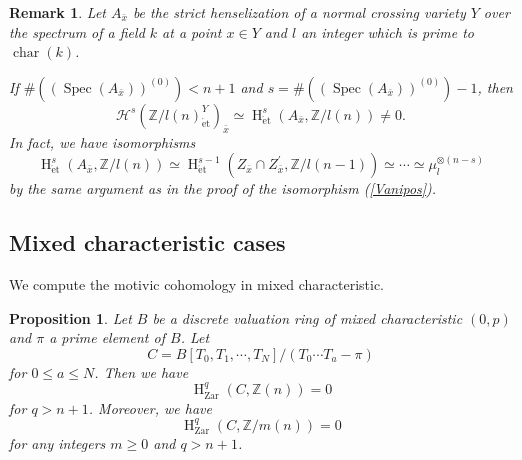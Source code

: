 \documentclass{article}
\newtheorem{prop}[thm]{\indent \sc Proposition}
\newtheorem{rem}[thm]{\indent \sc Remark}
\newcommand{\spec}{\operatorname{Spec}}
\newcommand{\et}{\mathrm{\acute{e}t}}
\newcommand{\Zar}{\mathrm{Zar}}
\newcommand{\HO}{\operatorname{H}}
\begin{document}
%
\begin{rem}\upshape
Let $A_{\bar{x}}$ be the strict henselization of a normal crossing variety $Y$ over the spectrum of a field $k$
at a point $x\in Y$ and $l$ an integer which is prime to $\operatorname{char}(k)$.

If $\#((\spec(A_{\bar{x}}))^{(0)})<n+1$ and
$s=\#((\spec(A_{\bar{x}}))^{(0)})-1$, then
%
\begin{equation*}
\mathcal{H}^{s}(
\mathbb{Z}/l(n)_{\et}^{Y}
)_{\bar{x}}
\simeq
\HO^{s}_{\et}(
A_{\bar{x}},
\mathbb{Z}/l(n)
) 
\neq 0.
\end{equation*}
%
In fact, we have isomorphisms
%
\begin{equation*}
\HO^{s}_{\et}(
A_{\bar{x}},
\mathbb{Z}/l(n)
)    
\simeq
\HO^{s-1}_{\et}(
Z_{\bar{x}}\cap Z_{\bar{x}}^{\prime},
\mathbb{Z}/l(n-1)
)
\simeq 
\cdots
\simeq
\mu_{l}^{\otimes (n-s)}
\end{equation*}
%
by the same argument as in the proof of the isomorphism (\ref{Vanipos}).
\end{rem}
%



\subsection{Mixed characteristic cases}
We compute the motivic cohomology in mixed characteristic.
%
\begin{prop}\upshape\label{VSC}
Let $B$ be a discrete valuation ring of mixed characteristic $(0, p)$
and 
$\pi$ a prime element of $B$.
Let
%
\begin{equation*}
C=
B[T_{0}, T_{1}, \cdots, T_{N}]/
(
T_{0}\cdots T_{a}
-\pi
)
\end{equation*}
%
for 
$0\leq a\leq N$.
Then we have
%
\begin{equation}\label{Vsg}
\HO^{q}_{\Zar}(
C, \mathbb{Z}(n)
)    
=0
\end{equation}
%
for $q> n+1$.
Moreover, we have
%
\begin{equation}\label{mVsg}
\HO^{q}_{\Zar}(
C, \mathbb{Z}/m(n)
)    
=0
\end{equation}
%
for any integers $m\geq 0$ and $q> n+1$.
%
\end{prop}
%
\end{document}
